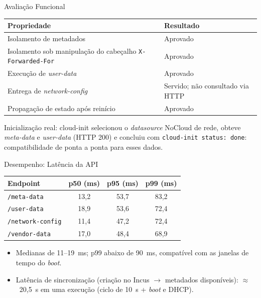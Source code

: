 \documentclass[aspectratio=169,xcolor=table]{beamer}
\begin{document}
\begin{frame}{Avaliação Funcional}
    \begin{table}
        \centering
        \small
        \begin{tabular}{>{\raggedright\arraybackslash}p{} >{\raggedright\arraybackslash}p{}}
            \toprule
            \textbf{Propriedade} & \textbf{Resultado} \\
            \midrule
            Isolamento de metadados & Aprovado \\
            Isolamento sob manipulação do cabeçalho \texttt{X-Forwarded-For} & Aprovado \\
            Execução de \textit{user-data} & Aprovado \\
            Entrega de \textit{network-config} & Servido; não consultado via HTTP \\
            Propagação de estado após reinício & Aprovado \\
            \bottomrule
        \end{tabular}
    \end{table}
    \vspace{0.3cm}
    Inicialização real: cloud-init selecionou o \textit{datasource} NoCloud de rede,
    obteve \textit{meta-data} e \textit{user-data} (HTTP 200) e concluiu com
    \texttt{cloud-init status: done}: compatibilidade de ponta a ponta para esses dados.
\end{frame}

\begin{frame}{Desempenho: Latência da API}
    \begin{table}
        \centering
        \begin{tabular}{lccc}
            \toprule
            \textbf{Endpoint} & \textbf{p50 (ms)} & \textbf{p95 (ms)} & \textbf{p99 (ms)} \\
            \midrule
            \texttt{/meta-data}       & 13{,}2 & 53{,}7 & 83{,}2 \\
            \texttt{/user-data}       & 18{,}9 & 53{,}6 & 72{,}4 \\
            \texttt{/network-config}  & 11{,}4 & 47{,}2 & 72{,}4 \\
            \texttt{/vendor-data}     & 17{,}0 & 48{,}4 & 68{,}9 \\
            \bottomrule
        \end{tabular}
    \end{table}
    \vspace{0.3cm}
    \begin{itemize}
        \item Medianas de 11--19~ms; p99 abaixo de 90~ms, compatível com as janelas
              de tempo do \textit{boot}.
        \item Latência de sincronização (criação no Incus $\rightarrow$ metadados
              disponíveis): $\approx$~20{,}5~s em uma execução (ciclo de 10~s + \textit{boot} e DHCP).
    \end{itemize}
\end{frame}
\end{document}
